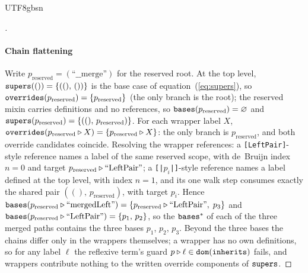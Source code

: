 \begin{CJK*}{UTF8}{gbsn}
\begin{proof}[]
  \paragraph{Chain flattening}
  Write $p_{\mathrm{reserved}} = (\text{``\_\_merge''})$ for the
  reserved root. At the top level,
  $\mathtt{supers}(()) = \{((),\, ())\}$ is the base case of
  equation~(\ref{eq:supers}), so
  $\mathtt{overrides}(p_{\mathrm{reserved}}) = \{p_{\mathrm{reserved}}\}$
  (the only branch is the root); the reserved mixin carries
  definitions and no references, so
  $\mathtt{bases}(p_{\mathrm{reserved}}) = \varnothing$ and
  $\mathtt{supers}(p_{\mathrm{reserved}}) =
  \{((),\, p_{\mathrm{reserved}})\}$. For each wrapper label $X$,
  $\mathtt{overrides}(p_{\mathrm{reserved}} \mathbin{\triangleright} X) =
  \{p_{\mathrm{reserved}} \mathbin{\triangleright} X\}$: the only branch is
  $p_{\mathrm{reserved}}$, and both override candidates coincide.
  Resolving the wrapper references: a
  \texttt{[LeftPair]}-style reference names a label of the
  same reserved scope, with de~Bruijn index $n = 0$ and target
  $p_{\mathrm{reserved}} \mathbin{\triangleright} \text{``LeftPair''}$; a
  \texttt{[|$p_i$|]}-style reference
  names a label defined at the top level, with index $n = 1$, and
  its one walk step consumes exactly the shared pair
  $((),\, p_{\mathrm{reserved}})$, with target $p_i$. Hence
  $\mathtt{bases}(p_{\mathrm{reserved}} \mathbin{\triangleright} \text{``mergedLeft''}) =
  \{p_{\mathrm{reserved}} \mathbin{\triangleright} \text{``LeftPair''},\; p_3\}$ and
  $\mathtt{bases}(p_{\mathrm{reserved}} \mathbin{\triangleright} \text{``LeftPair''}) =
  \{p_1,\, p_2\}$, so the $\mathtt{bases}^*$ of each of the three merged
  paths contains the three bases $p_1$, $p_2$, $p_3$. Beyond the
  three bases the chains differ only in the wrappers themselves; a
  wrapper has no own definitions, so for any label $\ell$ the
  reflexive term's guard $p \mathbin{\triangleright} \ell \in \mathtt{dom}(\mathtt{inherits})$ fails,
  and wrappers contribute nothing to the written override
  components of $\mathtt{supers}$.


\end{proof}
\end{CJK*}
